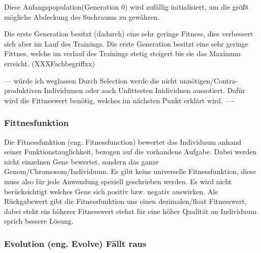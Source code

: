 Diese Anfangspopulation(Generation 0) wird zufällig initialisiert, um die größt mögliche Abdeckung des Suchraums zu gewähren. 

Die erste Generation besitzt (dadurch) eine sehr geringe Fitness, dies verbessert sich aber im Lauf des Trainings.
Die erste Generation besitzt eine sehr geringe Fittnes, welche im verlauf des Trainings stetig steigert bis sie das Maximum erreicht. (XXXFachbegriffxx)

--- würde ich weglassen
Durch Selection werde die nicht unnötigen/Contra-produktiven Individumen oder auch Unfittesten Inidividuen aussotiert.
Dafür wird die Fittneswert benötig, welches im nächsten Punkt erklärt wird.
----


\subsubsection{Fittnesfunktion}
Die Fitnessfunktion (eng. Fitnessfunction) bewertet das Individuum anhand seiner Funktionstauglichkeit, bezogen auf die vorhandene Aufgabe. Dabei werden nicht einzelnen Gene bewertet, sondern das ganze Genom/Chromosom/Individuum. Es gibt keine universelle Fitnessfunktion, diese muss also für jede Anwendung speziell geschrieben werden. Es wird nicht berücksichtigt welches Gene sich positiv bzw. negativ auswirken. Als Rückgabewert gibt die Fitnessfunktion uns einen dezimalen/float Fitnesswert, dabei steht ein höherer Fitnesswert stehst für eine höher Qualität an Individuum sprich bessere Lösung.

\iffalse
\subsubsection{Evolution (eng. Evolve) Fällt raus}

